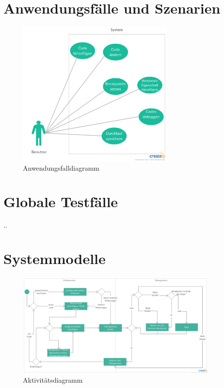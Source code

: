 \documentclass[parskip=full]{scrartcl}
\begin{document}
\newpage
\section{Anwendungsfälle und Szenarien}
\begin{figure}[h] 
  \centering
     \includegraphics[width=0.7\textwidth]{Anwendungsfalldiagramm}
  \caption{Anwendungsfalldiagramm}
  \label{fig:Bild1}
\end{figure}

\section{Globale Testfälle}
..

\newpage
\section{Systemmodelle}
\begin{figure}[h] 
  \centering
     \includegraphics[width=0.9\textwidth]{Aktivitaetsdiagramm}
  \caption{Aktivitätsdiagramm}
  \label{fig:Bild1}
\end{figure}
\end{document}
